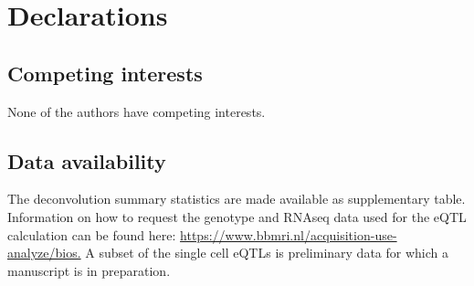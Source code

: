 \section{Declarations}
\subsection{Competing interests}
None of the authors have competing interests.
\subsection{Data availability}
The deconvolution summary statistics are made available as supplementary table. Information on how to request the genotype and RNAseq data used for the eQTL calculation can be found here: \url{https://www.bbmri.nl/acquisition-use-analyze/bios.} A subset of the single cell eQTLs is preliminary data for which a manuscript is in preparation.



